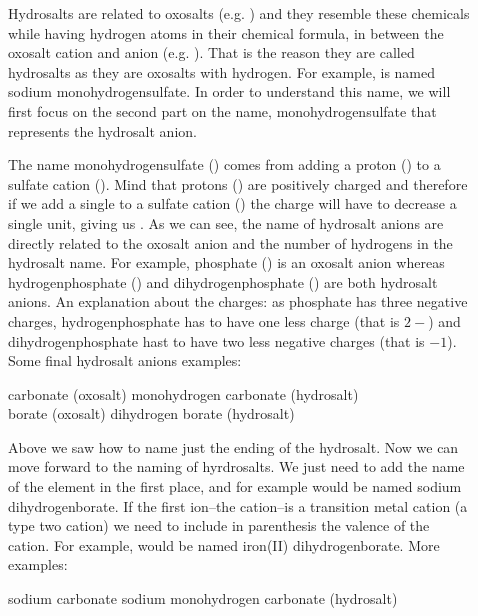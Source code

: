 \documentclass[main.tex]{subfiles}
\begin{document}
\begin{description}
\item[] 
Hydrosalts are related to oxosalts (e.g. ) and they resemble these chemicals while having hydrogen atoms in their chemical formula, in between the oxosalt cation and anion (e.g. ). That is the reason they are called hydrosalts as they are oxosalts with hydrogen. For example,  is named sodium monohydrogensulfate. In order to understand this name, we will first focus on the second part on the name, monohydrogensulfate that represents the hydrosalt anion.

The name monohydrogensulfate () comes from adding a proton () to a sulfate cation (). Mind that protons () are positively charged and therefore if we add a single  to a sulfate cation () the charge will have to decrease a single unit, giving us . As we can see, the name of hydrosalt anions are directly related to the oxosalt anion and the number of hydrogens in the hydrosalt name. For example, phosphate () is an oxosalt anion whereas hydrogenphosphate () and dihydrogenphosphate () are both hydrosalt anions. An explanation about the charges: as phosphate has three negative charges, hydrogenphosphate has to have one less charge (that is $2-$) and dihydrogenphosphate hast to have two less negative charges (that is $-1$). Some final hydrosalt anions examples:

 \begin{namingbox} {}
  \hfill carbonate ({\small oxosalt})	\hfill   {}\hfill monohydrogen carbonate ({\small hydrosalt})\\
    \hfill borate ({\small oxosalt})	\hfill   {}\hfill dihydrogen borate ({\small hydrosalt}) 
\end{namingbox}
Above we saw how to name just the ending of the hydrosalt. Now we can move forward to the naming of hyrdrosalts. We just need to add the name of the element in the first place, and for example  would be named sodium dihydrogenborate. If the first ion--the cation--is a transition metal cation (a type two cation) we need to include in parenthesis the valence of the cation. For example,  would be named iron(II) dihydrogenborate. More examples:
 \begin{namingbox} {}
  \hfill sodium carbonate 	\hfill   {} \hfill sodium monohydrogen carbonate ({\small hydrosalt})\\
\end{namingbox}


\end{description}
\end{document}
